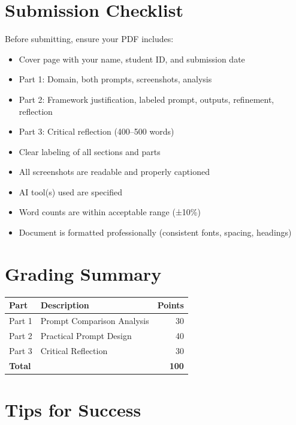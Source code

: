 \documentclass[11pt]{article}
\begin{document}
\section*{Submission Checklist}

Before submitting, ensure your PDF includes:

\begin{itemize}
    \item[$\square$] Cover page with your name, student ID, and submission date
    \item[$\square$] Part 1: Domain, both prompts, screenshots, analysis
    \item[$\square$] Part 2: Framework justification, labeled prompt, outputs, refinement, reflection
    \item[$\square$] Part 3: Critical reflection (400--500 words)
    \item[$\square$] Clear labeling of all sections and parts
    \item[$\square$] All screenshots are readable and properly captioned
    \item[$\square$] AI tool(s) used are specified
    \item[$\square$] Word counts are within acceptable range (±10\%)
    \item[$\square$] Document is formatted professionally (consistent fonts, spacing, headings)
\end{itemize}

\section*{Grading Summary}

\begin{center}
\begin{tabular}{llr}
\toprule
\textbf{Part} & \textbf{Description} & \textbf{Points} \\
\midrule
Part 1 & Prompt Comparison Analysis & 30 \\
Part 2 & Practical Prompt Design & 40 \\
Part 3 & Critical Reflection & 30 \\
\midrule
\textbf{Total} & & \textbf{100} \\
\bottomrule
\end{tabular}
\end{center}

\section*{Tips for Success}
\end{document}

